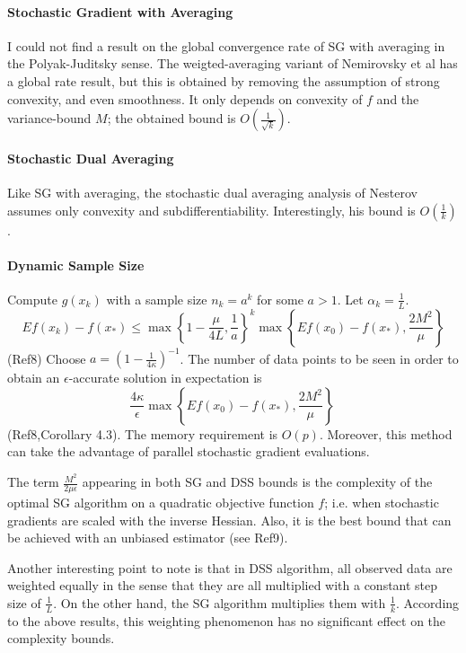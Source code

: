 \documentclass{article}
\begin{document}
 \paragraph{Stochastic Gradient with Averaging}  I could not find a result on the global convergence rate of SG with averaging in the Polyak-Juditsky sense.  The weigted-averaging variant of Nemirovsky et al has a global rate result, but this is obtained by removing the assumption of strong convexity, and even smoothness. It only depends on convexity of $f$ and the variance-bound $M$; the obtained bound is $O(\frac{1}{\sqrt{k}})$.  

 \paragraph{Stochastic Dual Averaging} Like SG with averaging, the stochastic dual averaging analysis of Nesterov assumes only convexity and subdifferentiability.  Interestingly, his bound is $O(\frac{1}{k})$.
 
 \paragraph{Dynamic Sample Size} Compute $g(x_k)$ with a sample size $n_k=a^k$ for some $a>1$.  Let $\alpha_k = \displaystyle\frac{1}{L}$.
 \[
   Ef(x_k)-f(x_\ast) \leq \max\left\lbrace 1-\frac{\mu}{4L},\frac{1}{a}\right\rbrace^k \max\left\lbrace Ef(x_0)-f(x_\ast), \frac{2M^2}{\mu}\right\rbrace
 \]
 (Ref8)
Choose $a=\left(1-\frac{1}{4\kappa}\right)^{-1}$.  The number of data points to be seen in order to obtain an $\epsilon$-accurate solution in expectation is 
\[
 \frac{4\kappa}{\epsilon}\max\left\lbrace Ef(x_0)-f(x_\ast), \frac{2M^2}{\mu}\right\rbrace\
\]
(Ref8,Corollary 4.3).  The memory requirement is $O(p)$.  Moreover, this method can take the advantage of parallel stochastic gradient evaluations.

The term $\displaystyle\frac{M^2}{2\mu\epsilon}$ appearing in both SG and DSS bounds is the complexity of the optimal SG algorithm on a quadratic objective function $f$; i.e. when stochastic gradients are scaled with the inverse Hessian.  Also, it is the best bound that can be achieved with an unbiased estimator (see Ref9).

Another interesting point to note is that in DSS algorithm, all observed data are weighted equally in the sense that they are all multiplied with a constant step size of $\frac{1}{L}$.  On the other hand, the SG algorithm multiplies them with $\frac{1}{k}$.  According to the above results, this weighting phenomenon has no significant effect on the complexity bounds.
\end{document}
